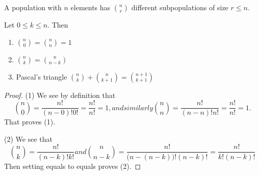 A population with $n$ elements has $\binom{n}{r}$ different
subpopulations of size $r\leq n$.

\label{thm:propertiesOfBinomialCoefficients}
Let $0\leq k\leq n$. Then
\begin{enumerate}
\item $\displaystyle\binom{n}{0}=\binom{n}{n}=1$
\item\label{thm:binom:prop:symmetry} $\displaystyle\binom{n}{k}=\binom{n}{n-k}$
\item Pascal's triangle $\displaystyle\binom{n}{k}+\binom{n}{k+1}=\binom{n+1}{k+1}$
\end{enumerate}

\begin{proof}
(1) We see by definition that
\begin{subequations}
\begin{equation}
\binom{n}{0}=\frac{n!}{(n-0)!0!}=\frac{n!}{n!}=1,
\end{equation}
and similarly
\begin{equation}
\binom{n}{n}=\frac{n!}{(n-n)!n!}=\frac{n!}{n!}=1.
\end{equation}
\end{subequations}
That proves (1).

(2) We see that
\begin{subequations}
\begin{equation}
\binom{n}{k}=\frac{n!}{(n-k)!k!}
\end{equation}
and
\begin{equation}
\binom{n}{n-k}=\frac{n!}{\bigl(n-(n-k)\bigr)!(n-k)!}=\frac{n!}{k!(n-k)!}
\end{equation}
\end{subequations}
Then setting equals to equals proves (2).


\end{proof}
